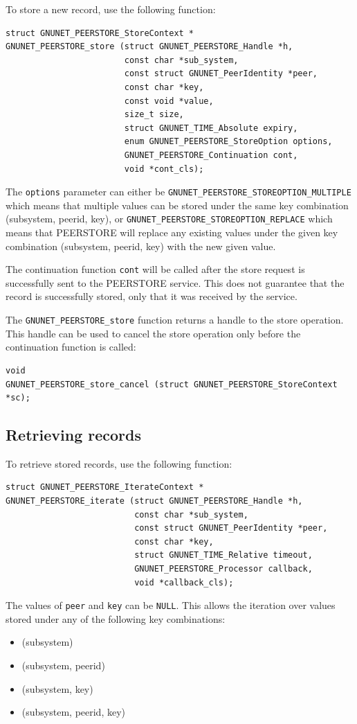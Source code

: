 \documentclass[10pt]{article}
\begin{document}
To store a new record, use the following function:
\begin{lstlisting}
struct GNUNET_PEERSTORE_StoreContext *
GNUNET_PEERSTORE_store (struct GNUNET_PEERSTORE_Handle *h,
                        const char *sub_system,
                        const struct GNUNET_PeerIdentity *peer,
                        const char *key,
                        const void *value,
                        size_t size,
                        struct GNUNET_TIME_Absolute expiry,
                        enum GNUNET_PEERSTORE_StoreOption options,
                        GNUNET_PEERSTORE_Continuation cont,
                        void *cont_cls);
\end{lstlisting}

The \lstinline|options| parameter can either be \lstinline|GNUNET_PEERSTORE_STOREOPTION_MULTIPLE|
which means that multiple values can be stored under the same key combination (subsystem, peerid, key),
or \lstinline|GNUNET_PEERSTORE_STOREOPTION_REPLACE| which means that PEERSTORE will replace any
existing values under the given key combination (subsystem, peerid, key) with the new given value.

The continuation function \lstinline|cont| will be called after the store request is successfully
sent to the PEERSTORE service. This does not guarantee that the record is successfully stored, only
that it was received by the service.

The \lstinline|GNUNET_PEERSTORE_store| function returns a handle to the store operation. This handle
can be used to cancel the store operation only before the continuation function is called:
\begin{lstlisting}
void
GNUNET_PEERSTORE_store_cancel (struct GNUNET_PEERSTORE_StoreContext *sc);
\end{lstlisting}

\subsection{Retrieving records}

To retrieve stored records, use the following function:
\begin{lstlisting}
struct GNUNET_PEERSTORE_IterateContext *
GNUNET_PEERSTORE_iterate (struct GNUNET_PEERSTORE_Handle *h,
                          const char *sub_system,
                          const struct GNUNET_PeerIdentity *peer,
                          const char *key,
                          struct GNUNET_TIME_Relative timeout,
                          GNUNET_PEERSTORE_Processor callback,
                          void *callback_cls);
\end{lstlisting}
The values of \lstinline|peer| and \lstinline|key| can be \lstinline|NULL|. This allows the
iteration over values stored under any of the following key combinations:
\begin{itemize}
\itemsep0em
  \item (subsystem)
  \item (subsystem, peerid)
  \item (subsystem, key)
  \item (subsystem, peerid, key)
\end{itemize}
\end{document}
